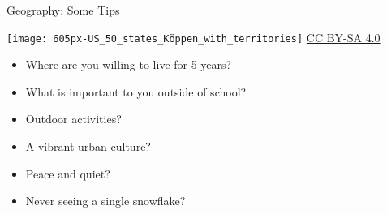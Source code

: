 \begin{frame}[fragile]{Geography: Some Tips}

    \begin{minipage}{0.45\textwidth}
        \texttt{[image: 605px-US\_50\_states\_Köppen\_with\_territories]}
        {\tiny \href{https://commons.wikimedia.org/w/index.php?curid=81751071}{CC BY-SA 4.0}}\\
        \vfill
    \end{minipage}
    \hspace{0.08\textwidth}
    \begin{minipage}{0.45\textwidth}
        \begin{itemize}
            \item Where are you willing to live for 5 years?
            \item What is important to you outside of school?
            \item Outdoor activities?
            \item A vibrant urban culture?
            \item Peace and quiet?
            \item Never seeing a single snowflake?
        \end{itemize}
    \end{minipage}
\end{frame}

